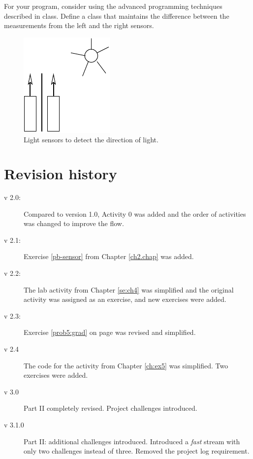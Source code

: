 \documentclass[12pt]{book}
\begin{document}
For your program, consider using the advanced programming techniques described in class. Define a class that maintains the difference between the measurements from
the left and the right sensors.

\begin{figure}[tb]
  \begin{center}
	\includegraphics[width=.2\textwidth]{figs/2eyes}
  \end{center}
\caption{Light sensors to detect the direction of
  light.}	\label{fig:2eyes} 
\end{figure}



\appendix
\chapter{Revision history}

\begin{description}
\item[v 2.0:] Compared to version 1.0, Activity 0 was added and the
  order of activities was changed to improve the flow.
\item[v 2.1:] Exercise \ref{pb-sensor} from Chapter \ref{ch2.chap} was
  added.
\item[v 2.2:] The lab activity from Chapter \ref{se:ch4} was
  simplified and the original activity was assigned as an exercise,
  and new exercises were added.
\item[v 2.3:] Exercise \ref{prob5:grad} on page \pageref{prob5:grad}
  was revised and simplified.
\item[v 2.4] The code for the activity from Chapter \ref{ch:ex5} was
  simplified. Two exercises were added.
\item[v 3.0] Part II completely revised. Project challenges introduced.

\item[v 3.1.0] Part II: additional challenges introduced. Introduced a \emph{fast} stream with only two challenges instead of three. Removed the project log requirement.
  
\end{description}
 
\end{document}
